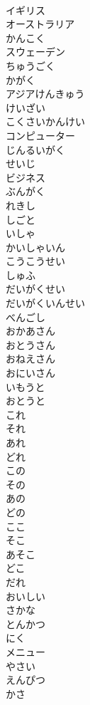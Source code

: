\documentclass[8pt]{extreport}
\begin{document}
\begin{CJK}{UTF8}{min}
\\	イギリス	
\\	オーストラリア	
\\	かんこく	
\\	スウェーデン	
\\	ちゅうごく	
\\	かがく	
\\	アジアけんきゅう	
\\	けいざい	
\\	こくさいかんけい	
\\	コンピューター	
\\	じんるいがく	
\\	せいじ	
\\	ビジネス	
\\	ぶんがく	
\\	れきし	
\\	しごと	
\\	いしゃ	
\\	かいしゃいん	
\\	こうこうせい	
\\	しゅふ	
\\	だいがくせい	
\\	だいがくいんせい	
\\	べんごし	
\\	おかあさん	
\\	おとうさん	
\\	おねえさん	
\\	おにいさん	
\\	いもうと	
\\	おとうと	
\\	これ	
\\	それ	
\\	あれ	
\\	どれ	
\\	この	
\\	その	
\\	あの	
\\	どの	
\\	ここ	
\\	そこ	
\\	あそこ	
\\	どこ	
\\	だれ	
\\	おいしい	
\\	さかな	
\\	とんかつ	
\\	にく	
\\	メニュー	
\\	やさい	
\\	えんぴつ	
\\	かさ	

\end{CJK}
\end{document}
